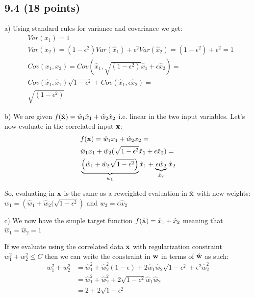 \documentclass[a4paper,12pt]{article}
\begin{document}
\subsection{9.4 (18 points)}
a)
Using standard rules for variance and covariance we get:
\begin{align}
&Var(x_1) = 1 \nonumber  \\
&Var(x_2) = (1-\epsilon^2)Var(\hat{x}_1) + \epsilon^2Var(\hat{x}_2) = (1-\epsilon^2) + \epsilon^2 = 1 \nonumber  \\
&Cov(x_1, x_2) = Cov(\hat{x}_1, \sqrt{(1-\epsilon^2)}\hat{x}_1 + \epsilon\hat{x}_2)  =  \nonumber  \\
&Cov(\hat{x}_1, \hat{x}_1) \sqrt{1-\epsilon^2} + Cov(\hat{x}_1, \epsilon \hat{x}_2) = \nonumber  \\
&\sqrt{(1-\epsilon^2)} \nonumber 
\end{align}

b)
We are given $f(\hat{\bold{x}}) = \hat{w}_1 \hat{x}_1 + \hat{w}_2 \hat{x}_2$ i.e. linear in the two input variables. Let's now evaluate in the correlated input $\bold{x}$:
\begin{align*}
&f(\bold{x}) =   \hat{w}_1x_1 + \hat{w}_2 x_2  = \\
& \hat{w}_1x_1 + \hat{w}_2(\sqrt{1-\epsilon^2} \hat{x}_1 + \epsilon \hat{x}_2 ) = \\
&\underbrace{\left(\hat{w}_1 + \hat{w}_2\sqrt{1-\epsilon^2} \right)}_{w_1} \hat{x}_1 + \underbrace{ \epsilon \hat{w}_2}_{\hat{x}_2} \hat{x}_2
\end{align*}

So, evaluating in $\bold{x}$ is the same as a reweighted evaluation in $\hat{\bold{x}}$ with new weights:
$w_1 = \left(\hat{w}_1 + \hat{w}_2(\sqrt{1-\epsilon^2} \right)$ and 
$w_2 = \epsilon \hat{w}_2$\newline

c)
We now have the simple target function $f(\hat{\bold{x}}) = \hat{x}_1 + \hat{x}_2$
meaning that $\hat{w}_1  = \hat{w}_2 = 1$

If we evaluate using the correlated data $\bold{x}$ with regularization constraint $w_1^2 + w_2^2 \leq C$ then we can write the constraint in $\bold{w}$ in terms of $\hat{\bold{w}}$ as such:
\begin{align*}
w_1^2 + w_2^2 &= \hat{w}_1^2 + \hat{w}_2^2 (1-\epsilon) + 2\hat{w}_1\hat{w}_2\sqrt{1-\epsilon^2} + \epsilon^2\hat{w}_2^2 \\
&= \hat{w}_1^2 + \hat{w}_2^2 + 2\sqrt{1-\epsilon^2} \hat{w}_1\hat{w}_2 \\
&= 2+2\sqrt{1-\epsilon^2}
\end{align*}
\end{document}
